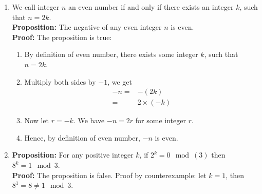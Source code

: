 \documentclass[11pt, preview]{standalone} %
\begin{document}
\begin{enumerate}
\item We call integer $n$ an even number if and only if there exists an integer $k$, such that $n = 2k$.\\
{\bf Proposition:} The negative of any even integer $n$ is even.\\
\textbf{Proof:} The proposition is true:
\begin{enumerate}[(1)]
\item By definition of even number, there exists some integer $k$, such that $n = 2k$.
\item Multiply both sides by $-1$, we get
  \begin{align*}
    -n =& -(2k)\\
    =& 2 \times (-k)
  \end{align*}
\item Now let $r = -k$. We have $-n = 2r$ for some integer $r$.
\item Hence, by definition of even number, $-n$ is even. 
\end{enumerate}
\begin{enumerate}
\end{enumerate}
\item {\bf Proposition:} For any positive integer $k$, if $2^k = 0 \mod(3)$ then $8^k = 1 \mod{3}$.\\
\textbf{Proof:} The proposition is false. Proof by counterexample: let $k = 1$, then $8^1 = 8 \neq 1 \mod{3}$.
\begin{enumerate}
\end{enumerate}
\end{enumerate}
\end{document}
